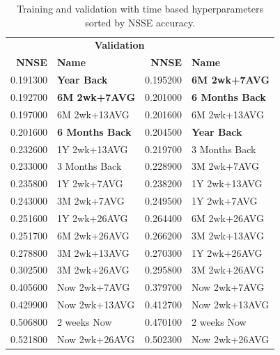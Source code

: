 \documentclass[utf8]{FrontiersinVancouver} %
\begin{document}
\begin{table}[!h]

  \caption{Training and validation with time based hyperparameters sorted by NSSE accuracy.}
  \label{tab:training}

\begin{center}
\begin{tabular}{|rl||rl|}
  \hline
\rule{0pt}{2ex}   
  \multicolumn{2}{c}{\bfseries Training} & \multicolumn{2}{c|}{\bfseries Validation} \\
              {\bf NNSE} & {\bf Name} & {\bf NNSE} & {\bf Name} \\
              \hline
\rule{0pt}{2ex} 
0.191300 & {\bf \color{red} Year Back} & 0.195200 & \color{blue} {\bf 6M 2wk+7AVG} \\
0.192700 & {\bf \color{blue} 6M 2wk+7AVG} & 0.201000 & \color{teal} {\bf 6 Months Back} \\
0.197000 & 6M 2wk+13AVG & 0.201600 & 6M 2wk+13AVG \\
0.201600 & \color{teal} {\bf 6 Months Back} & 0.204500 & \color{red} {\bf Year Back} \\
0.232600 & 1Y 2wk+13AVG & 0.219700 & 3 Months Back \\
0.233000 & 3 Months Back & 0.228900 & 3M 2wk+7AVG \\
0.235800 & 1Y 2wk+7AVG & 0.238200 & 1Y 2wk+13AVG \\
0.243000 & 3M 2wk+7AVG & 0.249500 & 1Y 2wk+7AVG \\
0.251600 & 1Y 2wk+26AVG & 0.264400 & 6M 2wk+26AVG \\
0.251700 & 6M 2wk+26AVG & 0.266200 & 3M 2wk+13AVG \\
0.278800 & 3M 2wk+13AVG & 0.270300 & 1Y 2wk+26AVG \\
0.302500 & 3M 2wk+26AVG & 0.295800 & 3M 2wk+26AVG \\
0.405600 & Now 2wk+7AVG & 0.379700 & Now 2wk+7AVG \\
0.429900 & Now 2wk+13AVG & 0.412700 & Now 2wk+13AVG \\
0.506800 & 2 weeks Now & 0.470100 & 2 weeks Now \\
0.521800 & Now 2wk+26AVG & 0.502300 & Now 2wk+26AVG \\
\hline
\end{tabular}
\end{center}

\end{table}
\end{document}
